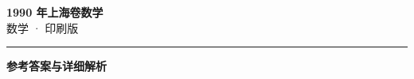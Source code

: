 \documentclass[zihao=5, a4paper]{ctexart}
\begin{document}
\begin{center}
  {\Large\bfseries 1990 年上海卷数学}\\[4pt]
  {\large 数学 · 印刷版}
\end{center}
\medskip
{}

\par\bigskip\hrule\bigskip
{}
\begin{center}{\large\bfseries 参考答案与详细解析}\end{center}
\smallskip

\end{document}
